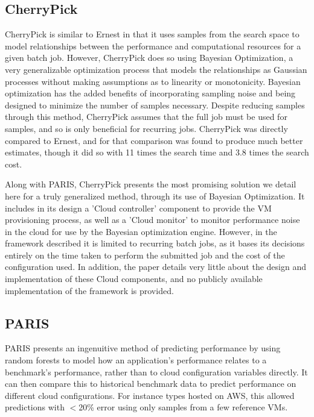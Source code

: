 \documentclass{report}
\begin{document}
\subsection{CherryPick}
CherryPick \cite{Alipourfard2017} is similar to Ernest in that it uses samples from the search space to model relationships between the performance and computational resources for a given batch job. However, CherryPick does so using Bayesian Optimization, a very generalizable optimization process that models the relationships as Gaussian processes without making assumptions as to linearity or monotonicity. Bayesian optimization has the added benefits of incorporating sampling noise and being designed to minimize the number of samples necessary. Despite reducing samples through this method, CherryPick assumes that the full job must be used for samples, and so is only beneficial for recurring jobs. CherryPick was directly compared to Ernest, and for that comparison was found to produce much better estimates, though it did so with 11 times the search time and 3.8 times the search cost\cite{Alipourfard2017}. 

Along with PARIS, CherryPick presents the most promising solution we detail here for a truly generalized method, through its use of Bayesian Optimization. It includes in its design a 'Cloud controller' component to provide the VM provisioning process, as well as a 'Cloud monitor' to monitor performance noise in the cloud for use by the Bayesian optimization engine. However, in the framework described it is limited to recurring batch jobs, as it bases its decisions entirely on the time taken to perform the submitted job and the cost of the configuration used. In addition, the paper details very little about the design and implementation of these Cloud components, and no publicly available implementation of the framework is provided.

\subsection{PARIS}
PARIS \cite{Yadwadkar2017} presents an ingenuitive method of predicting performance by using random forests to model how an application's performance relates to a benchmark's performance, rather than to cloud configuration variables directly. It can then compare this to historical benchmark data to predict performance on different cloud configurations. For instance types hosted on AWS, this allowed predictions with $<$20\% error using only samples from a few reference VMs.
\end{document}
